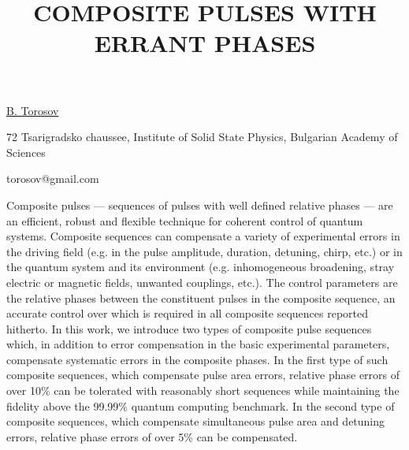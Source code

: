 \title{COMPOSITE PULSES WITH ERRANT PHASES}

\underline{B. Torosov}  

{\normalsize{\vspace{-4mm}
72 Tsarigradsko chaussee, Institute of Solid State Physics, Bulgarian Academy of Sciences



\email torosov@gmail.com}}

Composite pulses --- sequences of pulses with well defined relative phases --- are an efficient, robust and flexible technique for coherent control of quantum systems. Composite sequences can compensate a variety of experimental errors in the driving field (e.g. in the pulse amplitude, duration, detuning, chirp, etc.) or in the quantum system and its environment (e.g. inhomogeneous broadening, stray electric or magnetic fields, unwanted couplings, etc.). The control parameters are the relative phases between the constituent pulses in the composite sequence, an accurate control over which is required in all composite sequences reported hitherto. In this work, we introduce two types of composite pulse sequences which, in addition to error compensation in the basic experimental parameters, compensate systematic errors in the composite phases. In the first type of such composite sequences, which compensate pulse area errors, relative phase errors of over 10\% can be tolerated with reasonably short sequences while maintaining the fidelity above the 99.99\% quantum computing benchmark. In the second type of composite sequences, which compensate simultaneous pulse area and detuning errors, relative phase errors of over 5\% can be compensated.

\vspace{\baselineskip}